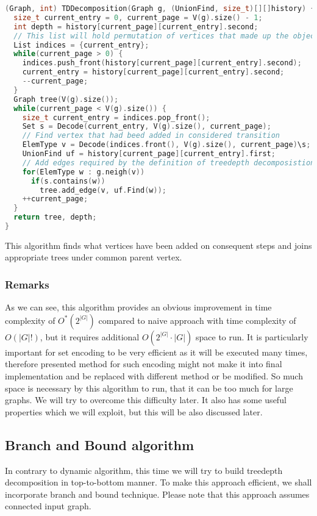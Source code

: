 \begin{lstlisting}[language=C++]
(Graph, int) TDDecomposition(Graph g, (UnionFind, size_t)[][]history) {
  size_t current_entry = 0, current_page = V(g).size() - 1;
  int depth = history[current_page][current_entry].second;
  // This list will hold permutation of vertices that made up the object in history[current_page][current_entry]
  List indices = {current_entry};
  while(current_page > 0) {
    indices.push_front(history[current_page][current_entry].second);
    current_entry = history[current_page][current_entry].second;
    --current_page;
  }
  Graph tree(V(g).size());
  while(current_page < V(g).size()) {
    size_t current_entry = indices.pop_front();
    Set s = Decode(current_entry, V(g).size(), current_page);
    // Find vertex that had beed added in considered transition
    ElemType v = Decode(indices.front(), V(g).size(), current_page)\s;
    UnionFind uf = history[current_page][current_entry].first;
    // Add edges required by the definition of treedepth decomposistion
    for(ElemType w : g.neigh(v))
      if(s.contains(w))
        tree.add_edge(v, uf.Find(w));
    ++current_page;
  }
  return tree, depth;
}
\end{lstlisting}
This algorithm finds what vertices have been added on consequent steps and joins appropriate trees under common parent vertex.
\subsubsection{Remarks}
As we can see, this algorithm provides an obvious improvement in time complexity of $O^{*}\left(2^{\left|G\right|}\right)$ compared to naive approach with time complexity of $O\left(\left|G\right|!\right)$, but it requires additional $O\left(2^{\left|G\right|}\cdot\left|G\right|\right)$ space to run. It is particularly important for set encoding to be very efficient as it will be executed many times, therefore presented method for such encoding might not make it into final implementation and be replaced with different method or be modified. So much space is necessary by this algorithm to run, that it can be too much for large graphs. We will try to overcome this difficulty later. It also has some useful properties which we will exploit, but this will be also discussed later.
\subsection{Branch and Bound algorithm}
In contrary to dynamic algorithm, this time we will try to build treedepth decomposition in top-to-bottom manner. To make this approach efficient, we shall incorporate branch and bound technique. Please note that this approach assumes connected input graph.
